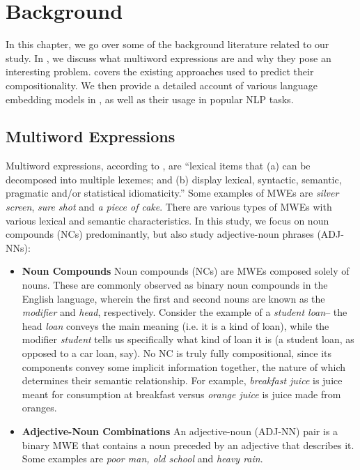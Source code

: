 \chapter{Background}

In this chapter, we go over some of the background literature related to our study. In , we discuss what multiword expressions are and why they pose an interesting problem.  covers the existing approaches used to predict their compositionality. We then provide a detailed account of various language embedding models in , as well as their usage in popular NLP tasks.

\section{Multiword Expressions}
\label{sec:MWE}
Multiword expressions, according to \cite{Baldwin2009}, are ``lexical items that (a) can be decomposed into multiple lexemes; and (b) display lexical, syntactic, semantic, pragmatic and/or statistical idiomaticity.'' Some examples of MWEs are \textit{silver screen}, \textit{sure shot} and \textit{a piece of cake}. There are various types of MWEs with various lexical and semantic characteristics. In this study, we focus on noun compounds (NCs) predominantly, but also study adjective-noun phrases (ADJ-NNs):
\begin{itemize}
    \item \textbf{Noun Compounds} Noun compounds (NCs) are MWEs composed solely of nouns. These are commonly observed as binary noun compounds in the English language, wherein the first and second nouns are known as the \textit{modifier} and \textit{head}, respectively. Consider the example of a \textit{student loan}-- the head \textit{loan} conveys the main meaning (i.e. it is a kind of loan), while the modifier \textit{student} tells us specifically what kind of loan it is (a student loan, as opposed to a car loan, say). No NC is truly fully compositional, since its components convey some implicit information together, the nature of which determines their semantic relationship. For example, \textit{breakfast juice} is juice meant for consumption at breakfast versus \textit{orange juice} is juice made from oranges.
    
    \item \textbf{Adjective-Noun Combinations} An adjective-noun (ADJ-NN) pair is a binary MWE that contains a noun preceded by an adjective that describes it. Some examples are \textit{poor man, old school} and \textit{heavy rain}.
\end{itemize}

